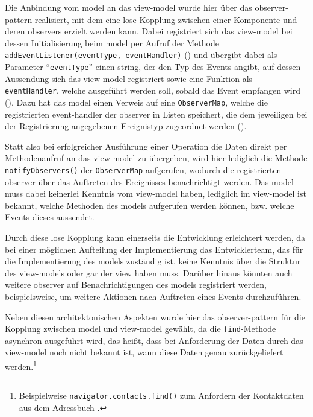 Die Anbindung vom \gls{model} an das \gls{view-model} wurde hier über das \gls{observer-pattern} realisiert, mit dem eine lose Kopplung zwischen einer Komponente und deren \glspl{observer} erzielt werden kann.
Dabei registriert sich das \gls{view-model} bei dessen Initialisierung beim \gls{model} per Aufruf der Methode \lstinline|addEventListener(eventType, eventHandler)| () und übergibt dabei als Parameter \enquote{\lstinline|eventType|} einen \gls{string}, der den Typ des Events angibt, auf dessen Aussendung sich das \gls{view-model} registriert sowie eine Funktion als \lstinline|eventHandler|, welche ausgeführt werden soll, sobald das Event empfangen wird ().
Dazu hat das \gls{model} einen Verweis auf eine \lstinline|ObserverMap|, welche die registrierten \gls{event-handler} der \gls{observer} in Listen speichert, die dem jeweiligen bei der Registrierung angegebenen Ereignistyp zugeordnet werden ().

Statt also bei erfolgreicher Ausführung einer Operation die Daten direkt per Methodenaufruf an das \gls{view-model} zu übergeben, wird hier lediglich die Methode \lstinline|notifyObservers()| der \lstinline|ObserverMap| aufgerufen, wodurch die registrierten \gls{observer} über das Auftreten des Ereignisses benachrichtigt werden.
Das \gls{model} muss dabei keinerlei Kenntnis vom \gls{view-model} haben, lediglich im \gls{view-model} ist bekannt, welche Methoden des \glspl{model} aufgerufen werden können, bzw. welche Events dieses aussendet.

Durch diese lose Kopplung kann einerseits die Entwicklung erleichtert werden, da bei einer möglichen Aufteilung der Implementierung das Entwicklerteam, das für die Implementierung des \glspl{model} zuständig ist, keine Kenntnis über die Struktur des \glspl{view-model} oder gar der \gls{view} haben muss. Darüber hinaus könnten auch weitere \gls{observer} auf Benachrichtigungen des \glspl{model} registriert werden, beispielsweise, um weitere Aktionen nach Auftreten eines Events durchzuführen.

Neben diesen architektonischen Aspekten wurde hier das \gls{observer-pattern} für die Kopplung zwischen \gls{model} und \gls{view-model} gewählt, da die \lstinline|find|-Methode \gls{asynchron} ausgeführt wird, das heißt, dass bei Anforderung der Daten durch das \gls{view-model} noch nicht bekannt ist, wann diese Daten genau zurückgeliefert werden.\footnote{Beispielweise \lstinline|navigator.contacts.find()| zum Anfordern der Kontaktdaten aus dem Adressbuch .}

